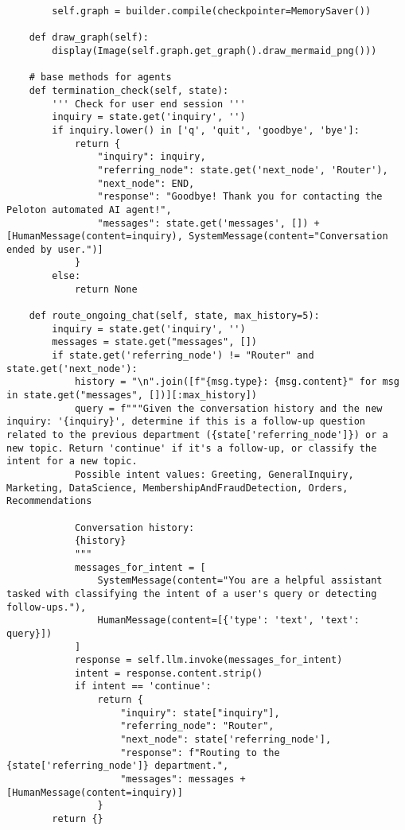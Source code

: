 \documentclass[11pt,letterpaper]{article}
\begin{document}
\begin{lstlisting}
        self.graph = builder.compile(checkpointer=MemorySaver())

    def draw_graph(self):
        display(Image(self.graph.get_graph().draw_mermaid_png()))
    
    # base methods for agents
    def termination_check(self, state):
        ''' Check for user end session '''
        inquiry = state.get('inquiry', '')
        if inquiry.lower() in ['q', 'quit', 'goodbye', 'bye']:
            return {
                "inquiry": inquiry,
                "referring_node": state.get('next_node', 'Router'),
                "next_node": END,
                "response": "Goodbye! Thank you for contacting the Peloton automated AI agent!",
                "messages": state.get('messages', []) + [HumanMessage(content=inquiry), SystemMessage(content="Conversation ended by user.")]            
            }
        else:
            return None
    
    def route_ongoing_chat(self, state, max_history=5):
        inquiry = state.get('inquiry', '')
        messages = state.get("messages", [])
        if state.get('referring_node') != "Router" and state.get('next_node'):
            history = "\n".join([f"{msg.type}: {msg.content}" for msg in state.get("messages", [])][:max_history])
            query = f"""Given the conversation history and the new inquiry: '{inquiry}', determine if this is a follow-up question related to the previous department ({state['referring_node']}) or a new topic. Return 'continue' if it's a follow-up, or classify the intent for a new topic.
            Possible intent values: Greeting, GeneralInquiry, Marketing, DataScience, MembershipAndFraudDetection, Orders, Recommendations
            
            Conversation history:
            {history}
            """
            messages_for_intent = [
                SystemMessage(content="You are a helpful assistant tasked with classifying the intent of a user's query or detecting follow-ups."),
                HumanMessage(content=[{'type': 'text', 'text': query}])
            ]
            response = self.llm.invoke(messages_for_intent)
            intent = response.content.strip()
            if intent == 'continue':
                return {
                    "inquiry": state["inquiry"],
                    "referring_node": "Router",
                    "next_node": state['referring_node'],
                    "response": f"Routing to the {state['referring_node']} department.",
                    "messages": messages + [HumanMessage(content=inquiry)]            
                }
        return {}    


\end{lstlisting}
\end{document}

